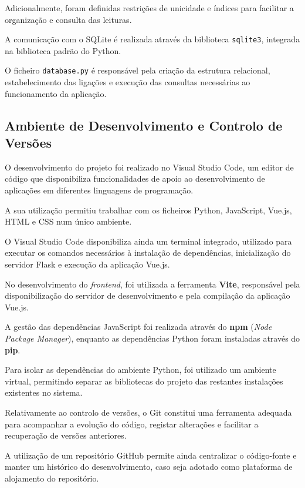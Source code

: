 Adicionalmente, foram definidas restrições
de unicidade e índices para facilitar
a organização e consulta das leituras.

A comunicação com o SQLite é realizada
através da biblioteca \texttt{sqlite3},
integrada na biblioteca padrão do Python.

O ficheiro \texttt{database.py} é responsável
pela criação da estrutura relacional,
estabelecimento das ligações e execução
das consultas necessárias ao funcionamento
da aplicação.


\subsection{Ambiente de Desenvolvimento e Controlo de Versões}
\label{subsec:ambiente}

O desenvolvimento do projeto foi realizado
no Visual Studio Code, um editor de código
que disponibiliza funcionalidades de apoio
ao desenvolvimento de aplicações em
diferentes linguagens de programação.

A sua utilização permitiu trabalhar com
os ficheiros Python, JavaScript, Vue.js,
HTML e CSS num único ambiente.

O Visual Studio Code disponibiliza ainda
um terminal integrado, utilizado para
executar os comandos necessários à
instalação de dependências, inicialização
do servidor Flask e execução da
aplicação Vue.js.

No desenvolvimento do \textit{frontend},
foi utilizada a ferramenta \textbf{Vite},
responsável pela disponibilização
do servidor de desenvolvimento e pela
compilação da aplicação Vue.js.

A gestão das dependências JavaScript foi
realizada através do \textbf{npm}
(\textit{Node Package Manager}), enquanto
as dependências Python foram instaladas
através do \textbf{pip}.

Para isolar as dependências do ambiente
Python, foi utilizado um ambiente virtual,
permitindo separar as bibliotecas do
projeto das restantes instalações
existentes no sistema.

Relativamente ao controlo de versões,
o Git constitui uma ferramenta adequada
para acompanhar a evolução do código,
registar alterações e facilitar a
recuperação de versões anteriores.

A utilização de um repositório GitHub
permite ainda centralizar o código-fonte
e manter um histórico do desenvolvimento,
caso seja adotado como plataforma de
alojamento do repositório.


